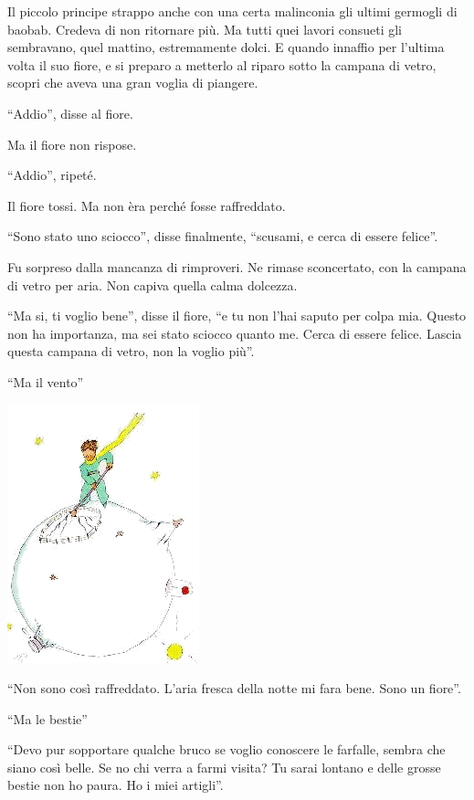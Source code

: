 \documentclass[11pt]{scrbook}
\begin{document}
Il piccolo principe strappo anche con una certa malinconia gli ultimi
germogli di baobab. Credeva di non ritornare più. Ma tutti quei lavori
consueti gli sembravano, quel mattino, estremamente dolci. E quando
innaffio per l'ultima volta il suo fiore, e si preparo a metterlo al
riparo sotto la campana di vetro, scopri che aveva una gran voglia di
piangere.

``Addio'', disse al fiore.

Ma il fiore non rispose.

``Addio'', ripeté.

Il fiore tossi. Ma non èra perché fosse raffreddato.

``Sono stato uno sciocco'', disse finalmente, ``scusami, e cerca di
essere felice''.

Fu sorpreso dalla mancanza di rimproveri. Ne rimase sconcertato, con la
campana di vetro per aria. Non capiva quella calma dolcezza.

``Ma si, ti voglio bene'', disse il fiore, ``e tu non l'hai saputo per
colpa mia. Questo non ha importanza, ma sei stato sciocco quanto me.
Cerca di essere felice. Lascia questa campana di vetro, non la voglio
più''.

``Ma il vento''

\begin{center}
\includegraphics{./img/9a.png}
\end{center}

``Non sono così raffreddato. L'aria fresca della notte mi fara bene.
Sono un fiore''.

``Ma le bestie''

``Devo pur sopportare qualche bruco se voglio conoscere le farfalle,
sembra che siano così belle. Se no chi verra a farmi visita? Tu sarai
lontano e delle grosse bestie non ho paura. Ho i miei artigli''.
\end{document}
